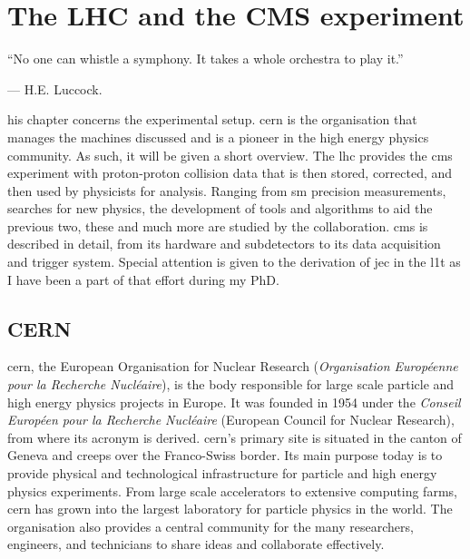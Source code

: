 \chapter{The LHC and the CMS experiment}
\label{chap:detector}

\epigraph{``No one can whistle a symphony. It takes a whole orchestra to play it.''}{--- H.E. Luccock.}

his chapter concerns the experimental setup. \acrshort{cern} is the organisation that manages the machines discussed and is a pioneer in the high energy physics community. As such, it will be given a short overview. The \acrlong{lhc} provides the \acrshort{cms} experiment with proton-proton collision data that is then stored, corrected, and then used by physicists for analysis. Ranging from \acrlong{sm} precision measurements, searches for new physics, the development of tools and algorithms to aid the previous two, these and much more are studied by the collaboration. \acrshort{cms} is described in detail, from its hardware and subdetectors to its data acquisition and trigger system. Special attention is given to the derivation of \acrfull{jec} in the \acrfull{l1t} as I have been a part of that effort during my PhD.




\section{CERN}
\label{sec:detector_cern}

\acrshort{cern}, the European Organisation for Nuclear Research (\emph{Organisation Europ\'{e}enne pour la Recherche Nucl\'{e}aire}), is the body responsible for large scale particle and high energy physics projects in Europe. It was founded in 1954 under the \emph{Conseil Europ\'{e}en pour la Recherche Nucl\'{e}aire} (European Council for Nuclear Research), from where its acronym is derived. \acrshort{cern}'s primary site is situated in the canton of Geneva and creeps over the Franco-Swiss border. Its main purpose today is to provide physical and technological infrastructure for particle and high energy physics experiments. From large scale accelerators to extensive computing farms, \acrshort{cern} has grown into the largest laboratory for particle physics in the world. The organisation also provides a central community for the many researchers, engineers, and technicians to share ideas and collaborate effectively.

